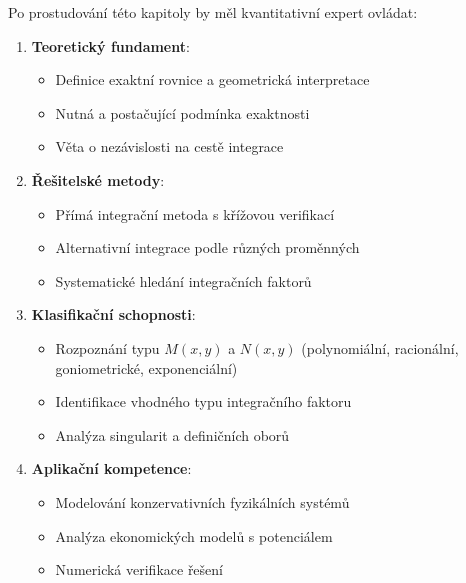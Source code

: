 \begin{summary}
\label{sum:kompletni-metodologie}
Po prostudování této kapitoly by měl kvantitativní expert ovládat:

\begin{enumerate}
\item \textbf{Teoretický fundament}:
\begin{itemize}
\item Definice exaktní rovnice a geometrická interpretace
\item Nutná a postačující podmínka exaktnosti
\item Věta o nezávislosti na cestě integrace
\end{itemize}

\item \textbf{Řešitelské metody}:
\begin{itemize}
\item Přímá integrační metoda s křížovou verifikací
\item Alternativní integrace podle různých proměnných
\item Systematické hledání integračních faktorů
\end{itemize}

\item \textbf{Klasifikační schopnosti}:
\begin{itemize}
\item Rozpoznání typu $M(x,y)$ a $N(x,y)$ (polynomiální, racionální, goniometrické, exponenciální)
\item Identifikace vhodného typu integračního faktoru
\item Analýza singularit a definičních oborů
\end{itemize}

\item \textbf{Aplikační kompetence}:
\begin{itemize}
\item Modelování konzervativních fyzikálních systémů
\item Analýza ekonomických modelů s potenciálem
\item Numerická verifikace řešení
\end{itemize}
\end{enumerate}
\end{summary}

\vspace{0.8\baselineskip}

